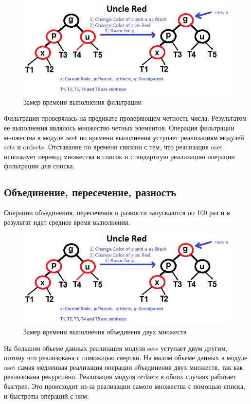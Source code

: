 		\begin{figure}[H]
				\centering
				\includegraphics[width=\textwidth]{img/tan-aus.png}
				\caption{Замер времени выполнения фильтрации}
		\end{figure}
		Фильтрация проверялась на предикате проверяющем четность числа. Результатом ее выполнения являлось множество
		четных элементов. Операция фильтрации множества в модуле oset по времени выполнения уступает реализациям 
		модулей sets и ordsets. Отставание по времени связано с тем, что реализация oset использует перевод множества в 
		список и стандартную реализацию операции фильтрации для списка.

	\subsection{Объединение, пересечение, разность}
		Операции объединения, пересечения и разности запускаются по 100 раз и в результат 
		идет среднее время выполнения.
		
		\begin{figure}[H]
				\centering
				\includegraphics[width=\textwidth]{img/tan-aus.png}
				\caption{Замер времени выполнения объединеия двух множеств}
		\end{figure}
		На большом объеме данных реализация модуля sets уступает двум другим, потому что реализована с поможщью свертки.
		На малом объеме данных в модуле oset самая медленная реализация операции объединения двух множеств, так как
		реализована рекурсивно. Реализация модуля ordsets в обоих случаях работает быстрее. Это происходит из-за 
		реализации самого множества с помощью списка, и быстроты операций с ним.
		
